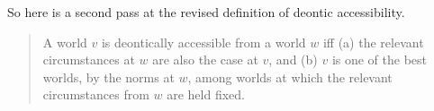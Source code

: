 
%
%
%

So here is a second pass at the revised definition of deontic accessibility.

\begin{quote}
  A world $v$ is deontically accessible from a world $w$ iff (a) the relevant
  circumstances at $w$ are also the case at $v$, and (b) $v$ is one of the best
  worlds, by the norms at $w$, among worlds at which the relevant circumstances
  from $w$ are held fixed.
\end{quote}

